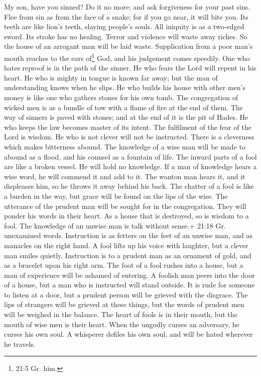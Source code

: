 My son, have you sinned? Do it no more; and ask forgiveness
for your past sins.  Flee from sin as from the face of a
snake; for if you go near, it will bite you. Its teeth are like lion's
teeth, slaying people's souls.  All iniquity is as a
two-edged sword. Its stroke has no healing.  Terror and
violence will waste away riches. So the house of an arrogant man will be
laid waste.  Supplication from a poor man's mouth reaches to
the ears of\footnote{21:5 Gr. him.} God, and his judgement comes
speedily.  One who hates reproof is in the path of the
sinner. He who fears the Lord will repent in his heart.  He
who is mighty in tongue is known far away; but the man of understanding
knows when he slips.  He who builds his house with other
men's money is like one who gathers stones for his own tomb.
 The congregation of wicked men is as a bundle of tow with a
flame of fire at the end of them.  The way of sinners is
paved with stones; and at the end of it is the pit of Hades.
 He who keeps the law becomes master of its intent. The
fulfilment of the fear of the Lord is wisdom.  He who is
not clever will not be instructed. There is a cleverness which makes
bitterness abound.  The knowledge of a wise man will be
made to abound as a flood, and his counsel as a fountain of life.
 The inward parts of a fool are like a broken vessel. He
will hold no knowledge.  If a man of knowledge hears a wise
word, he will commend it and add to it. The wanton man hears it, and it
displeases him, so he throws it away behind his back.  The
chatter of a fool is like a burden in the way, but grace will be found
on the lips of the wise.  The utterance of the prudent man
will be sought for in the congregation. They will ponder his words in
their heart.  As a house that is destroyed, so is wisdom to
a fool. The knowledge of an unwise man is talk without sense.+ 21:18 Gr.
unexamined words.  Instruction is as fetters on the feet of
an unwise man, and as manacles on the right hand.  A fool
lifts up his voice with laughter, but a clever man smiles quietly.
 Instruction is to a prudent man as an ornament of gold,
and as a bracelet upon his right arm.  The foot of a fool
rushes into a house, but a man of experience will be ashamed of
entering.  A foolish man peers into the door of a house,
but a man who is instructed will stand outside.  It is rude
for someone to listen at a door, but a prudent person will be grieved
with the disgrace.  The lips of strangers will be grieved
at these things, but the words of prudent men will be weighed in the
balance.  The heart of fools is in their mouth, but the
mouth of wise men is their heart.  When the ungodly curses
an adversary, he curses his own soul.  A whisperer defiles
his own soul, and will be hated wherever he travels.

